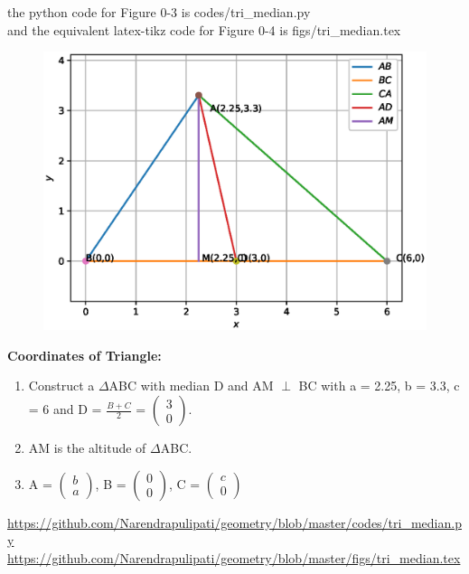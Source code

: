 \begin{frame}{}
the python code for  Figure 0-3 is codes/tri\_median.py\\
and the equivalent latex-tikz code for Figure 0-4 is figs/tri\_median.tex
\begin{figure}[!ht]
	\begin{center}
\includegraphics[width=0.8\columnwidth]{./figs/tri_median.eps}
	\end{center}
	\caption{}
	\label{}	
\end{figure}
\end{frame}
\begin{frame}{}
\begin{figure}[!ht]
	\begin{center}
		\resizebox{0.6\columnwidth}{!}{}
	\end{center}
	\caption{}
	\label{}	
\end{figure}
\end{frame}
\begin{frame}
\textbf{Coordinates of Triangle:}
\begin{enumerate}

\item Construct a $\Delta$ABC with median D and AM $\perp$ BC with a = 2.25, b = 3.3, c = 6 and D = $\frac{B+C}{2}$ = $\begin{pmatrix} 3\\0 \end{pmatrix}.$
\item  AM is the altitude of $\Delta$ABC.\\
\item A = $\begin{pmatrix} b\\a \end{pmatrix}$, B = $\begin{pmatrix} 0\\0 \end{pmatrix}$, C = $\begin{pmatrix} c\\0 \end{pmatrix}$ 
\end{enumerate}
\url{https://github.com/Narendrapulipati/geometry/blob/master/codes/tri_median.py}
\url{https://github.com/Narendrapulipati/geometry/blob/master/figs/tri_median.tex}
\end{frame}
